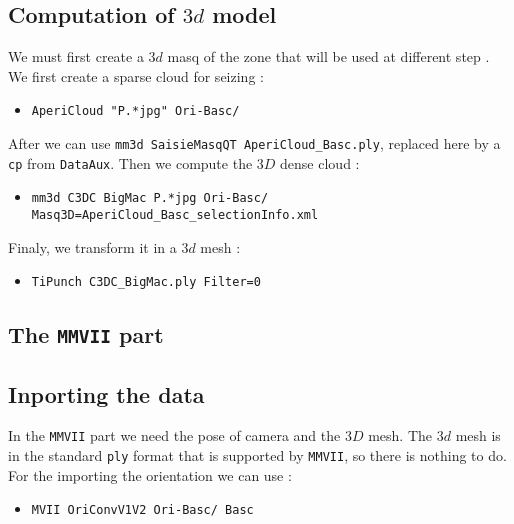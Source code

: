 
\subsection{Computation of $3d$ model}

We must first create a $3d$ masq of the zone that will be used at different step .
We first create a sparse cloud for seizing :

\begin{itemize}
	\item {\tt AperiCloud "P.*jpg" Ori-Basc/}
\end{itemize}

After we can use {\tt mm3d SaisieMasqQT AperiCloud\_Basc.ply}, 
replaced here by a {\tt cp} from {\tt DataAux}.
Then we compute the $3D$ dense cloud :

\begin{itemize}
	\item {\tt mm3d C3DC BigMac P.*jpg Ori-Basc/ Masq3D=AperiCloud\_Basc\_selectionInfo.xml}
\end{itemize}

Finaly, we transform it in a $3d$ mesh :

\begin{itemize}
	\item {\tt TiPunch C3DC\_BigMac.ply Filter=0}
\end{itemize}


\subsection{The  {\tt MMVII} part}


\subsection{Inporting the data}

In the {\tt MMVII} part we need the pose of camera and the $3D$ mesh. The $3d$ mesh is 
in the standard  {\tt ply} format that is supported by  {\tt MMVII}, so there is nothing
to do. For the importing the orientation  we can use :

\begin{itemize}
	\item {\tt MVII OriConvV1V2 Ori-Basc/ Basc}
\end{itemize}

